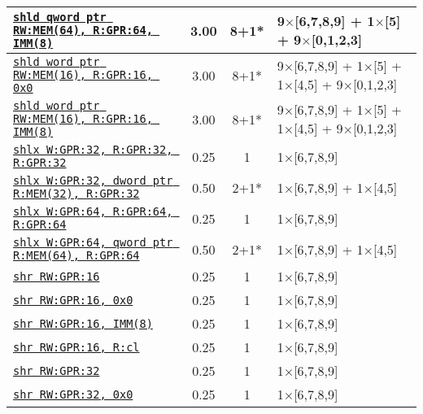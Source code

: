 \documentclass[a4paper,english,fontsize=9]{scrartcl}
\begin{document}
\begin{longtable}{p{}ccL{.25\textwidth}}
  \midrule
  \texttt{\href{https://felixcloutier.com/x86/SHLD.html}{shld qword ptr RW:MEM(64), R:GPR:64, IMM(8)}} & 3.00 & 8+1* & 9\(\times\)[6,7,8,9] + 1\(\times\)[5] + 9\(\times\)[0,1,2,3] \\
  \midrule
  \texttt{\href{https://felixcloutier.com/x86/SHLD.html}{shld word ptr RW:MEM(16), R:GPR:16, 0x0}} & 3.00 & 8+1* & 9\(\times\)[6,7,8,9] + 1\(\times\)[5] + 1\(\times\)[4,5] + 9\(\times\)[0,1,2,3] \\
  \midrule
  \texttt{\href{https://felixcloutier.com/x86/SHLD.html}{shld word ptr RW:MEM(16), R:GPR:16, IMM(8)}} & 3.00 & 8+1* & 9\(\times\)[6,7,8,9] + 1\(\times\)[5] + 1\(\times\)[4,5] + 9\(\times\)[0,1,2,3] \\
  \midrule
  \texttt{\href{https://felixcloutier.com/x86/SARX:SHLX:SHRX.html}{shlx W:GPR:32, R:GPR:32, R:GPR:32}} & 0.25 & 1 & 1\(\times\)[6,7,8,9] \\
  \midrule
  \texttt{\href{https://felixcloutier.com/x86/SARX:SHLX:SHRX.html}{shlx W:GPR:32, dword ptr R:MEM(32), R:GPR:32}} & 0.50 & 2+1* & 1\(\times\)[6,7,8,9] + 1\(\times\)[4,5] \\
  \midrule
  \texttt{\href{https://felixcloutier.com/x86/SARX:SHLX:SHRX.html}{shlx W:GPR:64, R:GPR:64, R:GPR:64}} & 0.25 & 1 & 1\(\times\)[6,7,8,9] \\
  \midrule
  \texttt{\href{https://felixcloutier.com/x86/SARX:SHLX:SHRX.html}{shlx W:GPR:64, qword ptr R:MEM(64), R:GPR:64}} & 0.50 & 2+1* & 1\(\times\)[6,7,8,9] + 1\(\times\)[4,5] \\
  \midrule
  \texttt{\href{https://felixcloutier.com/x86/SAL:SAR:SHL:SHR.html}{shr RW:GPR:16}} & 0.25 & 1 & 1\(\times\)[6,7,8,9] \\
  \midrule
  \texttt{\href{https://felixcloutier.com/x86/SAL:SAR:SHL:SHR.html}{shr RW:GPR:16, 0x0}} & 0.25 & 1 & 1\(\times\)[6,7,8,9] \\
  \midrule
  \texttt{\href{https://felixcloutier.com/x86/SAL:SAR:SHL:SHR.html}{shr RW:GPR:16, IMM(8)}} & 0.25 & 1 & 1\(\times\)[6,7,8,9] \\
  \midrule
  \texttt{\href{https://felixcloutier.com/x86/SAL:SAR:SHL:SHR.html}{shr RW:GPR:16, R:cl}} & 0.25 & 1 & 1\(\times\)[6,7,8,9] \\
  \midrule
  \texttt{\href{https://felixcloutier.com/x86/SAL:SAR:SHL:SHR.html}{shr RW:GPR:32}} & 0.25 & 1 & 1\(\times\)[6,7,8,9] \\
  \midrule
  \texttt{\href{https://felixcloutier.com/x86/SAL:SAR:SHL:SHR.html}{shr RW:GPR:32, 0x0}} & 0.25 & 1 & 1\(\times\)[6,7,8,9] \\

\end{longtable}
\end{document}
